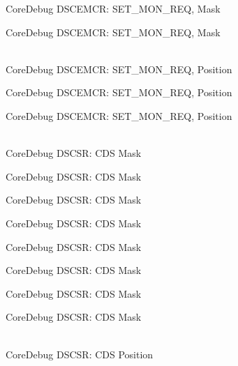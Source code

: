 \begin{DoxyRefList}
\label{deprecated__deprecated000527}%
%
Core\+Debug DSCEMCR:\+ SET\+\_\+\+MON\+\_\+\+REQ, Mask 

\label{deprecated__deprecated000629}%
%
Core\+Debug DSCEMCR:\+ SET\+\_\+\+MON\+\_\+\+REQ, Mask  
\item[{\parbox[t]{\linewidth}{Global \doxylink{group__CMSIS__SCB_ga77f02a6d773fa2c6daafbbdd7df2d9d2}{Core\+Debug\+\_\+\+DSCEMCR\+\_\+\+SET\+\_\+\+MON\+\_\+\+REQ\+\_\+\+Pos} }}]\hfill \\
\label{deprecated__deprecated000075}%
%
Core\+Debug DSCEMCR:\+ SET\+\_\+\+MON\+\_\+\+REQ, Position 

\label{deprecated__deprecated000526}%
%
Core\+Debug DSCEMCR:\+ SET\+\_\+\+MON\+\_\+\+REQ, Position 

\label{deprecated__deprecated000628}%
%
Core\+Debug DSCEMCR:\+ SET\+\_\+\+MON\+\_\+\+REQ, Position  
\item[{\parbox[t]{\linewidth}{Global \doxylink{group__CMSIS__SCB_ga083417245e1aa40e84a2b12433a15a6b}{Core\+Debug\+\_\+\+DSCSR\+\_\+\+CDS\+\_\+\+Msk} }}]\hfill \\
\label{deprecated__deprecated000094}%
%
Core\+Debug DSCSR:\+ CDS Mask 

\label{deprecated__deprecated000148}%
%
Core\+Debug DSCSR:\+ CDS Mask 

\label{deprecated__deprecated000224}%
%
Core\+Debug DSCSR:\+ CDS Mask 

\label{deprecated__deprecated000287}%
%
Core\+Debug DSCSR:\+ CDS Mask 

\label{deprecated__deprecated000366}%
%
Core\+Debug DSCSR:\+ CDS Mask 

\label{deprecated__deprecated000442}%
%
Core\+Debug DSCSR:\+ CDS Mask 

\label{deprecated__deprecated000545}%
%
Core\+Debug DSCSR:\+ CDS Mask 

\label{deprecated__deprecated000647}%
%
Core\+Debug DSCSR:\+ CDS Mask  
\item[{\parbox[t]{\linewidth}{Global \doxylink{group__CMSIS__SCB_ga4be5d0f8af5d7d8ec04bde78ce18e10e}{Core\+Debug\+\_\+\+DSCSR\+\_\+\+CDS\+\_\+\+Pos} }}]\hfill \\
\label{deprecated__deprecated000093}%
%
Core\+Debug DSCSR:\+ CDS Position 


\end{DoxyRefList}
